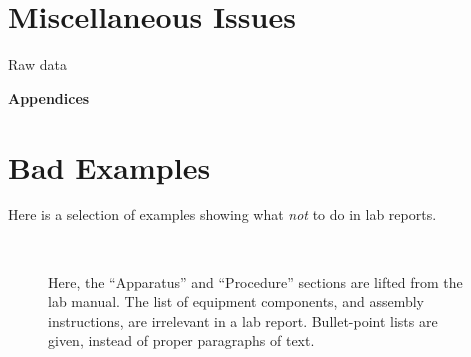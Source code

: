 \documentclass[11pt,a4paper]{article}
\begin{document}
\section{Miscellaneous Issues}

Raw data

\pagebreak

\begin{center}
  {\LARGE \textbf{Appendices}}
\end{center}

\appendix
\section{Bad Examples}
\label{sec:bad-examples}

Here is a selection of examples showing what \textit{not} to do in lab
reports.

\begin{figure}[h]
  \centering
   \\
  \caption{\small Here, the ``Apparatus'' and ``Procedure'' sections are
    lifted from the lab manual.  The list of equipment components, and
    assembly instructions, are irrelevant in a lab report.
    Bullet-point lists are given, instead of proper paragraphs of
    text.}
\end{figure}
\end{document}
